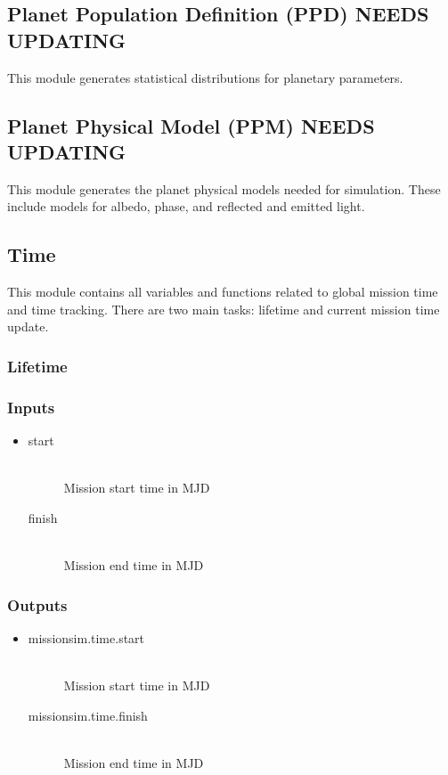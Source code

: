 \documentclass[]{asme2ej}
\begin{document}

\subsection{Planet Population Definition (PPD) NEEDS UPDATING}
This module generates statistical distributions for planetary parameters.


\subsection{Planet Physical Model (PPM) NEEDS UPDATING}
This module generates the planet physical models needed for simulation. These include models for albedo, phase, and reflected and emitted light.

\subsection{Time}
This module contains all variables and functions related to global mission time and time tracking. There are two main tasks: lifetime and current mission time update.

\subsubsection{Lifetime}

\subsubsection*{Inputs}
\begin{itemize}
    \item
    \begin{description}
        \item[start] \hfill \\
        Mission start time in MJD
        \item[finish] \hfill \\
        Mission end time in MJD
    \end{description}
\end{itemize}

\subsubsection*{Outputs}
\begin{itemize}
    \item
    \begin{description}
        \item[missionsim.time.start] \hfill \\
        Mission start time in MJD
        \item[missionsim.time.finish] \hfill \\
        Mission end time in MJD
    \end{description}
\end{itemize}
\end{document}
